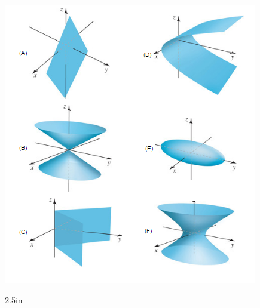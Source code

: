 \documentclass[12pt, addpoints]{exam/exam}
\newcommand{\vstr}{\vspace{\stretch{1}}}
\theoremstyle{plain}
\begin{document}
\begin{questions}
\begin{center}
\includegraphics[scale=1.5]{exam1Surfaces}
\end{center}


 
\vspace
{2.5in}
\vstr

 


\end{questions}
\end{document}
